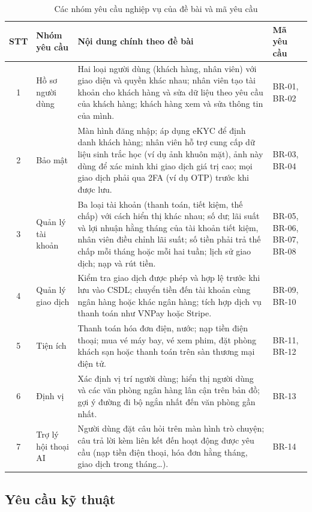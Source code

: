 \begin{table}[H]
	\centering
	\caption{Các nhóm yêu cầu nghiệp vụ của đề bài và mã yêu cầu}
	\label{tab:ch1-yeu-cau-nghiep-vu}
	\linespread{1.15}\small
	\begin{tabularx}{\textwidth}{@{}c p{3.1cm} X p{2.2cm}@{}}
		\toprule
		\textbf{STT} & \textbf{Nhóm yêu cầu} & \textbf{Nội dung chính theo đề bài} & \textbf{Mã yêu cầu} \\
		\midrule
		1 & Hồ sơ người dùng & Hai loại người dùng (khách hàng, nhân viên) với giao diện và quyền khác nhau; nhân viên tạo tài khoản cho khách hàng và sửa dữ liệu theo yêu cầu của khách hàng; khách hàng xem và sửa thông tin của mình. & BR-01, BR-02 \\
		\midrule
		2 & Bảo mật & Màn hình đăng nhập; áp dụng eKYC để định danh khách hàng; nhân viên hỗ trợ cung cấp dữ liệu sinh trắc học (ví dụ ảnh khuôn mặt), ảnh này dùng để xác minh khi giao dịch giá trị cao; mọi giao dịch phải qua 2FA (ví dụ OTP) trước khi được lưu. & BR-03, BR-04 \\
		\midrule
		3 & Quản lý tài khoản & Ba loại tài khoản (thanh toán, tiết kiệm, thế chấp) với cách hiển thị khác nhau; số dư; lãi suất và lợi nhuận hằng tháng của tài khoản tiết kiệm, nhân viên điều chỉnh lãi suất; số tiền phải trả thế chấp mỗi tháng hoặc mỗi hai tuần; lịch sử giao dịch; nạp và rút tiền. & BR-05, BR-06, BR-07, BR-08 \\
		\midrule
		4 & Quản lý giao dịch & Kiểm tra giao dịch được phép và hợp lệ trước khi lưu vào CSDL; chuyển tiền đến tài khoản cùng ngân hàng hoặc khác ngân hàng; tích hợp dịch vụ thanh toán như VNPay hoặc Stripe. & BR-09, BR-10 \\
		\midrule
		5 & Tiện ích & Thanh toán hóa đơn điện, nước; nạp tiền điện thoại; mua vé máy bay, vé xem phim, đặt phòng khách sạn hoặc thanh toán trên sàn thương mại điện tử. & BR-11, BR-12 \\
		\midrule
		6 & Định vị & Xác định vị trí người dùng; hiển thị người dùng và các văn phòng ngân hàng lân cận trên bản đồ; gợi ý đường đi bộ ngắn nhất đến văn phòng gần nhất. & BR-13 \\
		\midrule
		7 & Trợ lý hội thoại AI & Người dùng đặt câu hỏi trên màn hình trò chuyện; câu trả lời kèm liên kết đến hoạt động được yêu cầu (nạp tiền điện thoại, hóa đơn hằng tháng, giao dịch trong tháng\ldots). & BR-14 \\
		\bottomrule
	\end{tabularx}
\end{table}

\subsection{Yêu cầu kỹ thuật}

